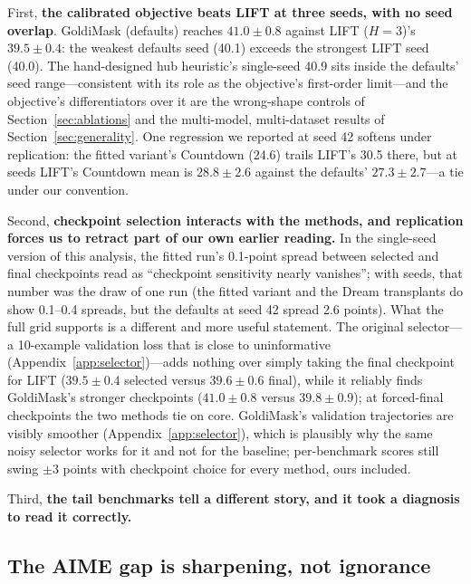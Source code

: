 \documentclass{article} %
\begin{document}
First, \textbf{the calibrated objective beats LIFT at three seeds, with no seed overlap}. GoldiMask (defaults) reaches $41.0 \pm 0.8$ against LIFT ($H{=}3$)'s $39.5 \pm 0.4$: the weakest defaults seed (40.1) exceeds the strongest LIFT seed (40.0). The hand-designed hub heuristic's single-seed 40.9 sits inside the defaults' seed range---consistent with its role as the objective's first-order limit---and the objective's differentiators over it are the wrong-shape controls of Section~\ref{sec:ablations} and the multi-model, multi-dataset results of Section~\ref{sec:generality}. One regression we reported at seed 42 softens under replication: the fitted variant's Countdown (24.6) trails LIFT's 30.5 there, but at seeds LIFT's Countdown mean is $28.8 \pm 2.6$ against the defaults' $27.3 \pm 2.7$---a tie under our convention.

Second, \textbf{checkpoint selection interacts with the methods, and replication forces us to retract part of our own earlier reading.} In the single-seed version of this analysis, the fitted run's 0.1-point spread between selected and final checkpoints read as ``checkpoint sensitivity nearly vanishes''; with seeds, that number was the draw of one run (the fitted variant and the Dream transplants do show 0.1--0.4 spreads, but the defaults at seed 42 spread 2.6 points). What the full grid supports is a different and more useful statement. The original selector---a 10-example validation loss that is close to uninformative (Appendix~\ref{app:selector})---adds nothing over simply taking the final checkpoint for LIFT ($39.5 \pm 0.4$ selected versus $39.6 \pm 0.6$ final), while it reliably finds GoldiMask's stronger checkpoints ($41.0 \pm 0.8$ versus $39.8 \pm 0.9$); at forced-final checkpoints the two methods tie on core. GoldiMask's validation trajectories are visibly smoother (Appendix~\ref{app:selector}), which is plausibly why the same noisy selector works for it and not for the baseline; per-benchmark scores still swing $\pm 3$ points with checkpoint choice for every method, ours included.

Third, \textbf{the tail benchmarks tell a different story, and it took a diagnosis to read it correctly.}

\subsection{The AIME gap is sharpening, not ignorance}
\label{sec:aime}
\end{document}
